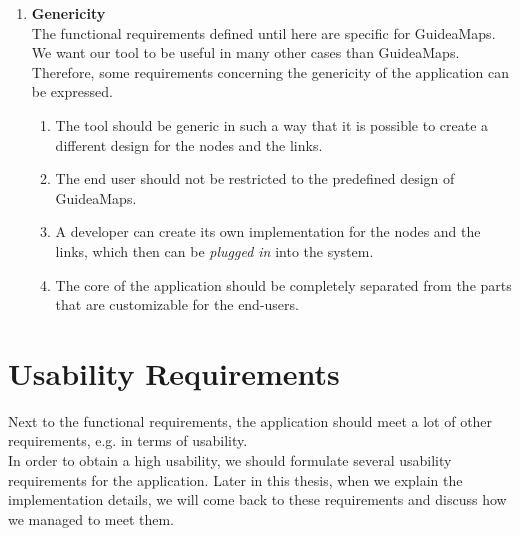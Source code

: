\begin{enumerate}[label=\textbf{\arabic*}., ref=\arabic*]
	\item \textbf{Genericity\label{item:genericity}} \hfill \\
	The functional requirements defined until here are specific for GuideaMaps. We want our tool to be useful in many other cases than GuideaMaps. Therefore, some requirements concerning the genericity of the application can be expressed.
  	\begin{enumerate}
		\item The tool should be generic in such a way that it is possible to create a different design for the nodes and the links. 
		\item The end user should not be restricted to the predefined design of GuideaMaps. 
		\item A developer can create its own implementation for the nodes and the links, which then can be \textit{plugged in} into the system.
		\item The core of the application should be completely separated from the parts that are customizable for the end-users.
	\end{enumerate}
  
\end{enumerate}




\section{Usability Requirements}\label{sec:usability-requirements}
Next to the functional requirements, the application should meet a lot of other requirements, e.g. in terms of usability.\\

In order to obtain a high usability, we should formulate several usability requirements for the application. Later in this thesis, when we explain the implementation details, we will come back to these requirements and discuss how we managed to meet them.

